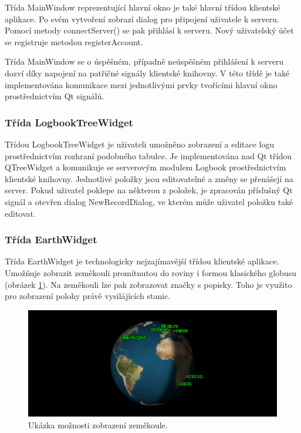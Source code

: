 Třída MainWindow reprezentující hlavní okno je také hlavní třídou klientské aplikace. Po svém vytvoření zobrazí dialog
pro připojení uživatele k serveru. Pomocí metody connectServer() se pak přihlásí
k serveru. Nový uživatelský
účet se registruje metodou registerAccount.

Třída MainWindow se o úspěšném, případně neúspěšném přihlášení k serveru dozví díky napojení
na patřičné signály klientské knihovny. V této třídě je také implementována komunikace mezi jednotlivými prvky tvořícími hlavní okno
prostřednictvím Qt signálů.

\subsubsection{Třída LogbookTreeWidget}

Třídou LogbookTreeWidget je uživateli umožněno zobrazení a editace logu prostřednictvím rozhraní podobného tabulce.
Je implementována nad Qt třídou QTreeWidget a komunikuje 
se serverovým modulem Logbook prostřednictvím klientské knihovny. Jednotlivé položky jsou editovatelné a změny se přenášejí
na server. Pokud uživatel poklepe na některou z položek, je zpracován příslušný Qt signál a otevřen dialog NewRecordDialog,
ve kterém může uživatel položku také editovat.

\subsubsection{Třída EarthWidget}

Třída EarthWidget je technologicky nejzajímavější třídou klientské aplikace. Umožňuje zobrazit zeměkouli promítnutou do roviny i 
formou klasického globusu (obrázek \ref{fig:globus}). Na zeměkouli lze pak zobrazovat značky s popisky. Toho je využito pro zobrazení polohy právě vysilájících
stanic.

\begin{figure}[h]
\centering
\includegraphics[trim=0cm 0cm 0cm 0cm, scale=0.9]{fig/ham5}
\caption{Ukázka možnosti zobrazení zeměkoule.}
\label{fig:globus}
\end{figure}

